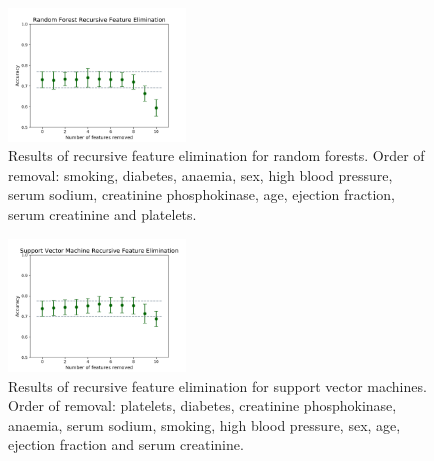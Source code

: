 \documentclass[notitlepage, reprint, nofootinbib]{revtex4-1}
\begin{document}
\begin{figure}[h!]
	\centering
	\includegraphics[width=0.42\textwidth]{../Figures/recursive_feature_elimination_RFC.png}
	\caption{Results of recursive feature elimination for random forests. Order of removal: smoking, diabetes, anaemia, sex, high blood pressure, serum sodium, creatinine phosphokinase, age, ejection fraction, serum creatinine and platelets.}
	\label{elim_RFC}
\end{figure}

\begin{figure}[h!]
	\centering
	\includegraphics[width=0.42\textwidth]{../Figures/recursive_feature_elimination_SVM.png}
	\caption{Results of recursive feature elimination for support vector machines. Order of removal: platelets, diabetes, creatinine phosphokinase, anaemia, serum sodium, smoking, high blood pressure, sex, age, ejection fraction and serum creatinine.}
	\label{elim_SVM}
\end{figure}
\newpage
\end{document}
